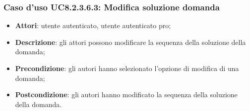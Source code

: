 \subsubsection{Caso d'uso UC8.2.3.6.3: Modifica soluzione domanda}
\begin{itemize}
	\item \textbf{Attori}: utente autenticato, utente autenticato pro;
	\item \textbf{Descrizione}: gli attori possono modificare la sequenza della soluzione della domanda;
	\item \textbf{Precondizione}: gli autori hanno selezionato l'opzione di modifica di una domanda;
	\item \textbf{Postcondizione}: gli autori hanno modificato la sequenza della soluzione della domanda. 
\end{itemize}